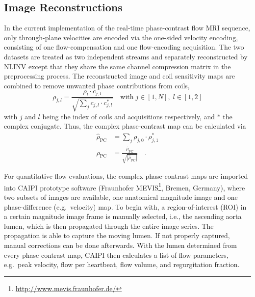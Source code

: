 \subsection{Image Reconstructions}
In the current implementation of the real-time phase-contrast flow MRI sequence, only through-plane velocities are encoded via the one-sided velocity encoding, consisting of one flow-compensation and one flow-encoding acquisition. The two datasets are treated as two independent streams and separately reconstructed by NLINV except that they share the same channel compression matrix in the preprocessing process. The reconstructed image and coil sensitivity maps are combined to remove unwanted phase contributions from coils,
\begin{equation} \label{Equ:rtmri-pc-rho-coil}
  \rho_{j,l} = \frac{\rho_l \cdot c_{j,l}}{\sqrt{\sum_{j} c_{j,l} \cdot c^{*}_{j,l}}} \quad \text{with} \; j \in [1,N], \; l \in [1,2]
\end{equation}
with $j$ and $l$ being the index of coils and acquisitions respectively, and $*$ the complex conjugate. Thus, the complex phase-contrast map can be calculated via
\begin{align}
  \hat{\rho}_{\text{PC}} &= \sum_{j} \rho_{j,0} \cdot \rho^{*}_{j,1} \\
  \rho_{\text{PC}} &= \frac{\hat{\rho}_{\text{PC}}}{\sqrt{|\hat{\rho}_{\text{PC}}|}} \quad .
\end{align}

For quantitative flow evaluations, the complex phase-contrast maps are imported into CAIPI prototype software (Fraunhofer MEVIS\footnote{\url{http://www.mevis.fraunhofer.de/}}, Bremen, Germany), where two subsets of images are available, one anatomical magnitude image and one phase-difference (e.g.~velocity) map. To begin with, a region-of-interest (\acs{ROI}) in a certain magnitude image frame is manually selected, i.e., the ascending aorta lumen, which is then propagated through the entire image series. The propagation is able to capture the moving lumen. If not properly captured, manual corrections can be done afterwards. With the lumen determined from every phase-contrast map, CAIPI then calculates a list of flow parameters, e.g.~peak velocity, flow per heartbeat, flow volume, and regurgitation fraction.



